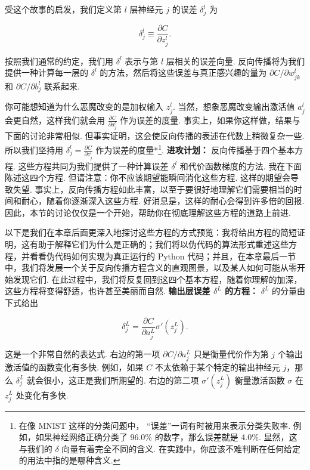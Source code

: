 受这个故事的启发，我们定义第 $l$ 层神经元 $j$ 的误差 $\delta^l_j$ 为

\begin{equation}
\delta^l_j \equiv \frac{\partial C}{\partial z^l_j}.
\tag{29}
\end{equation}

\noindent 按照我们通常的约定，我们用 $\delta^l$ 表示与第 $l$ 层相关的误差向量. 反向传播将为我们提供一种计算每一层的 $\delta^l$ 的方法，然后将这些误差与真正感兴趣的量为 $\partial C / \partial w^l_{jk}$ 和 $\partial C / \partial b^l_j$ 联系起来.

你可能想知道为什么恶魔改变的是加权输入 $z^l_j$. 当然，想象恶魔改变输出激活值 $a^l_j$ 会更自然，这样我们就会用 $\frac{\partial C}{\partial a^l_j}$ 作为误差的度量. 事实上，如果你这样做，结果与下面的讨论非常相似. 但事实证明，这会使反向传播的表述在代数上稍微复杂一些. 所以我们坚持用 $\delta^l_j = \frac{\partial C}{\partial z^l_j}$ 作为误差的度量*\footnote{在像 MNIST 这样的分类问题中， ``误差''一词有时被用来表示分类失败率. 例如，如果神经网络正确分类了 96.0\% 的数字，那么误差就是 4.0\%. 显然，这与我们的 $\delta$ 向量有着完全不同的含义. 在实践中，你应该不难判断在任何给定的用法中指的是哪种含义.}. \textbf{进攻计划：} 反向传播基于四个基本方程. 这些方程共同为我们提供了一种计算误差 $\delta^l$ 和代价函数梯度的方法. 我在下面陈述这四个方程. 但请注意：你不应该期望能瞬间消化这些方程. 这样的期望会导致失望. 事实上，反向传播方程如此丰富，以至于要很好地理解它们需要相当的时间和耐心，随着你逐渐深入这些方程. 好消息是，这样的耐心会得到许多倍的回报. 因此，本节的讨论仅仅是一个开始，帮助你在彻底理解这些方程的道路上前进.

以下是我们在本章后面更深入地探讨这些方程的方式预览：我将给出方程的简短证明，这有助于解释它们为什么是正确的；我们将以伪代码的算法形式重述这些方程，并看看伪代码如何实现为真正运行的 Python 代码；并且，在本章最后一节中，我们将发展一个关于反向传播方程含义的直观图景，以及某人如何可能从零开始发现它们. 在此过程中，我们将反复回到这四个基本方程，随着你理解的加深，这些方程将变得舒适，也许甚至美丽而自然. \textbf{输出层误差 $\delta^L$ 的方程：} $\delta^L$ 的分量由下式给出

\begin{equation}
\delta^L_j = \frac{\partial C}{\partial a^L_j} \sigma'(z^L_j).
\tag{BP1}
\end{equation}

\noindent 这是一个非常自然的表达式. 右边的第一项 $\partial C / \partial a^L_j$ 只是衡量代价作为第 $j$ 个输出激活值的函数变化有多快. 例如，如果 $C$ 不太依赖于某个特定的输出神经元 $j$，那么 $\delta^L_j$ 就会很小，这正是我们所期望的. 右边的第二项 $\sigma'(z^L_j)$ 衡量激活函数 $\sigma$ 在 $z^L_j$ 处变化有多快.

